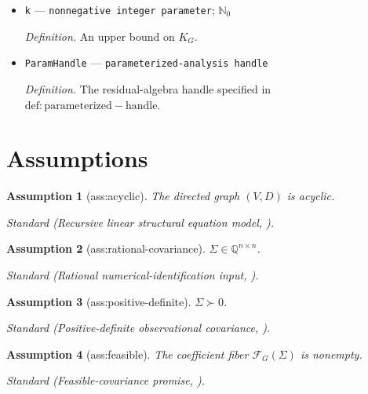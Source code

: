 \documentclass{article}
\newtheorem{assumption}{Assumption}
\begin{document}
\begin{itemize}
  \par\smallskip\noindent\emph{Definition.} \(K_G=|\{v\in V:|\operatorname{pa}_D(v)|=2\}|\).
  \item \texttt{k} --- \texttt{nonnegative integer parameter}; \(\mathbb N_0\)
  \par\smallskip\noindent\emph{Definition.} An upper bound on \(K_G\).
  \item \texttt{ParamHandle} --- \texttt{parameterized-\allowbreak{}analysis handle}
  \par\smallskip\noindent\emph{Definition.} The residual-algebra handle specified in \(\mathrm{def:parameterized-handle}\).
\end{itemize}

\section{Assumptions}

\begin{assumption}[ass:acyclic]\label{ass:acyclic}
The directed graph \((V,D)\) is acyclic.
\par\smallskip\noindent\emph{Standard} (Recursive linear structural equation model, \cite{DorflerVanDerZanderBlaserLiskiewicz2024}).
\end{assumption}

\begin{assumption}[ass:rational-covariance]\label{ass:rational-covariance}
\(\Sigma\in\mathbb Q^{n\times n}\).
\par\smallskip\noindent\emph{Standard} (Rational numerical-identification input, \cite{DorflerVanDerZanderBlaserLiskiewicz2024}).
\end{assumption}

\begin{assumption}[ass:positive-definite]\label{ass:positive-definite}
\(\Sigma\succ0\).
\par\smallskip\noindent\emph{Standard} (Positive-definite observational covariance, \cite{DorflerVanDerZanderBlaserLiskiewicz2024}).
\end{assumption}

\begin{assumption}[ass:feasible]\label{ass:feasible}
The coefficient fiber \(\mathcal F_G(\Sigma)\) is nonempty.
\par\smallskip\noindent\emph{Standard} (Feasible-covariance promise, \cite{DorflerVanDerZanderBlaserLiskiewicz2024}).
\end{assumption}
\end{document}
